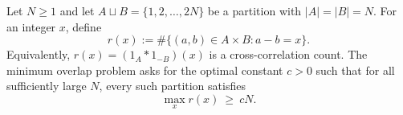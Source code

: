 Let $N\ge 1$ and let $A\sqcup B=\{1,2,\dots,2N\}$ be a partition with $|A|=|B|=N$.
For an integer $x$, define
\[
 r(x):=\#\{(a,b)\in A\times B: a-b=x\}.
\]
Equivalently, $r(x)=(1_A\ast 1_{-B})(x)$ is a cross-correlation count.
The minimum overlap problem asks for the optimal constant $c>0$ such that for all sufficiently large $N$, every such partition satisfies
\[
\max_x r(x)\ \ge\ cN.
\]
